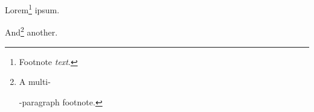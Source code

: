 Lorem\footnote{Footnote \emph{text}.
} ipsum.

And\footnote{A multi-

-paragraph footnote.
} another.


